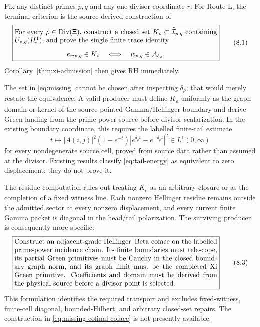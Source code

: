\documentclass[11pt]{article}
\theoremstyle{definition}
\theoremstyle{remark}
\newcommand{\cA}{\mathcal A}
\newcommand{\cI}{\mathcal I}
\newcommand{\Div}{\operatorname{Div}}
\begin{document}
Fix any distinct primes \(p,q\) and any one divisor coordinate \(r\).
For Route L, the terminal criterion is the source-derived construction of
\[
\boxed{
\begin{minipage}{0.84\linewidth}
For every \(\rho\in\Div(\Xi)\), construct a closed set
\(K_\rho\subset\widehat{\cI}_{p,q}\) containing
\(U_{p,q}(H^1_{\!c})\), and prove the single finite trace identity
\begin{center}
\(\displaystyle
 e_{r;p,q}\in K_\rho
 \quad\Longleftrightarrow\quad
 w_{p,q}\in\cA_{\delta_\rho}.
\)
\end{center}
\end{minipage}}
\tag{8.1}\label{eq:missing}
\]
Corollary~\ref{thm:xi-admission} then gives RH immediately.

The set in \eqref{eq:missing} cannot be chosen after inspecting
\(\delta_\rho\); that would merely restate the equivalence.  A valid
producer must define \(K_\rho\) uniformly as the graph domain or kernel of
the source-pointed Gamma/Hellinger boundary and derive Green landing from
the prime-power source before divisor scalarization.  In the existing
boundary coordinate, this requires the labelled finite-tail estimate
\[
 t\longmapsto |A(i,j)|^2(1-e^{-t})
 \left|e^{\delta_\rho t}-e^{-\delta_\rho t}\right|^2
 \in L^1(0,\infty)
\tag{8.2}\label{eq:tail-energy}
\]
for every nondegenerate source cell, proved from source data rather than
assumed at the divisor.  Existing results classify
\eqref{eq:tail-energy} as equivalent to zero displacement; they do not
prove it.

The residue computation rules out treating \(K_\rho\) as an arbitrary
closure or as the completion of a fixed witness line.  Each nonzero
Hellinger residue remains outside the admitted sector at every nonzero
displacement, and every current finite Gamma packet is diagonal in the
head/tail polarization.  The surviving producer is consequently more
specific:
\[
\boxed{
\begin{minipage}{0.84\linewidth}
Construct an adjacent-grade Hellinger--Beta coface on the labelled
prime-power incidence chain.  Its finite boundaries must telescope, its
partial Green primitives must be Cauchy in the closed boundary graph norm,
and its graph limit must be the completed Xi Green primitive.  Coefficients
and domain must be derived from the physical source before a divisor point
is selected.
\end{minipage}}
\tag{8.3}\label{eq:missing-cofinal-coface}
\]
This formulation identifies the required transport and excludes
fixed-witness, finite-cell diagonal, bounded-Hilbert, and arbitrary
closed-set repairs.  The construction in
\eqref{eq:missing-cofinal-coface} is not presently available.
\end{document}
